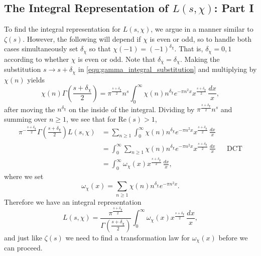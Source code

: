 \documentclass[12pt]{book}
\theoremstyle{definition}\newframedtheorem{method}{Method}
\renewcommand{\d}{\delta}
\newcommand{\z}{\zeta}
\newcommand{\w}{\omega}
\newcommand{\G}{\Gamma}
\newcommand{\<}{\langle}
\renewcommand{\>}{\rangle}
\newcommand{\conj}{\overline}
\newcommand{\cchi}{\conj{\chi}}
\renewcommand{\Re}{\mathrm{Re}}
\begin{document}
    \subsection*{The Integral Representation of \texorpdfstring{$L(s,\chi)$}{L(s,x)}: Part I}
      To find the integral representation for $L(s,\chi)$, we argue in a manner similar to $\z(s)$. However, the following will depend if $\chi$ is even or odd, so to handle both cases simultaneously set $\d_{\chi}$ so that $\chi(-1) = (-1)^{\d_{\chi}}$. That is, $\d_{\chi} = 0,1$ according to whether $\chi$ is even or odd. Note that $\d_{\cchi} = \d_{\chi}$. Making the substitution $s \to s+\d_{\chi}$ in \cref{equ:gamma_integral_substitution} and multiplying by $\chi(n)$ yields
      \[
        \chi(n)\G\left(\frac{s+\d_{\chi}}{2}\right) = \pi^{\frac{s+\d_{\chi}}{2}} n^{s}\int_{0}^{\infty}\chi(n)n^{\d_{\chi}}e^{-\pi n^{2}x}x^{\frac{s+\d_{\chi}}{2}}\,\frac{dx}{x},
      \]
      after moving the $n^{\d_{\chi}}$ on the inside of the integral. Dividing by $\pi^{\frac{s+\d_{\chi}}{2}}n^{s}$ and summing over $n \ge 1$, we see that for $\Re(s) > 1$,
      \begin{align*}
        \pi^{-\frac{s+\d_{\chi}}{2}}\G\left(\frac{s+\d_{\chi}}{2}\right)L(s,\chi) &= \sum_{n \ge 1}\int_{0}^{\infty}\chi(n)n^{\d_{\chi}}e^{-\pi n^{2}x}x^{\frac{s+\d_{\chi}}{2}}\,\frac{dx}{x} \\
        &= \int_{0}^{\infty}\sum_{n \ge 1}\chi(n)n^{\d_{\chi}}e^{-\pi n^{2}x}x^{\frac{s+\d_{\chi}}{2}}\,\frac{dx}{x} && \text{DCT} \\
        &= \int_{0}^{\infty}\w_{\chi}(x)x^{\frac{s+\d_{\chi}}{2}}\,\frac{dx}{x},
      \end{align*}
      where we set
      \[
        \w_{\chi}(x) = \sum_{n \ge 1}\chi(n)n^{\d_{\chi}}e^{-\pi n^{2}x}.
      \]
      Therefore we have an integral representation
      \begin{equation}\label{equ:integral_representation_Dirichlet_L-functions_1}
        L(s,\chi) = \frac{\pi^{\frac{s+\d_{\chi}}{2}}}{\G\left(\frac{s+\d_{\chi}}{2}\right)}\int_{0}^{\infty}\w_{\chi}(x)x^{\frac{s+\d_{\chi}}{2}}\,\frac{dx}{x},
      \end{equation}
      and just like $\z(s)$ we need to find a transformation law for $\w_{\chi}(x)$ before we can proceed.
\end{document}
